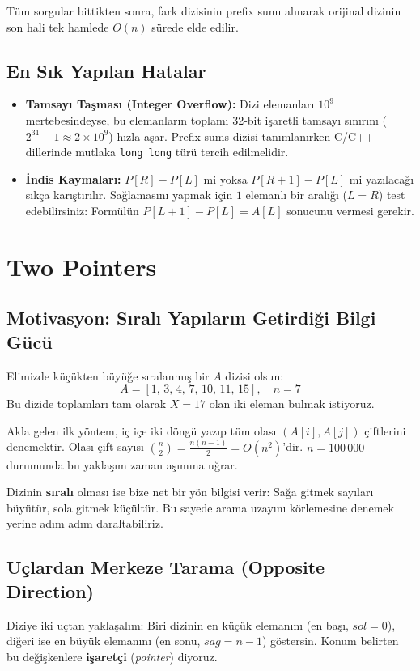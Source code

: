 Tüm sorgular bittikten sonra, fark dizisinin prefix sumı alınarak orijinal dizinin son hali tek hamlede $O(n)$ sürede elde edilir.

\subsection*{En Sık Yapılan Hatalar}
\begin{itemize}
    \item \textbf{Tamsayı Taşması (Integer Overflow):} Dizi elemanları $10^9$ mertebesindeyse, bu elemanların toplamı 32-bit işaretli tamsayı sınırını ($2^{31}-1 \approx 2 \times 10^9$) hızla aşar. Prefix sums dizisi tanımlanırken C/C++ dillerinde mutlaka \texttt{long long} türü tercih edilmelidir.
    \item \textbf{İndis Kaymaları:} $P[R] - P[L]$ mi yoksa $P[R+1] - P[L]$ mi yazılacağı sıkça karıştırılır. Sağlamasını yapmak için $1$ elemanlı bir aralığı ($L = R$) test edebilirsiniz: Formülün $P[L+1] - P[L] = A[L]$ sonucunu vermesi gerekir.
\end{itemize}

\section{Two Pointers}

\subsection{Motivasyon: Sıralı Yapıların Getirdiği Bilgi Gücü}
Elimizde küçükten büyüğe sıralanmış bir $A$ dizisi olsun:
\[
A = [1, \, 3, \, 4, \, 7, \, 10, \, 11, \, 15], \quad n = 7
\]
Bu dizide toplamları tam olarak $X = 17$ olan iki eleman bulmak istiyoruz.

Akla gelen ilk yöntem, iç içe iki döngü yazıp tüm olası $(A[i], A[j])$ çiftlerini denemektir. Olası çift sayısı $\binom{n}{2} = \frac{n(n-1)}{2} = O(n^2)$'dir. $n = 100\,000$ durumunda bu yaklaşım zaman aşımına uğrar.

Dizinin \textbf{sıralı} olması ise bize net bir yön bilgisi verir: Sağa gitmek sayıları büyütür, sola gitmek küçültür. Bu sayede arama uzayını körlemesine denemek yerine adım adım daraltabiliriz.

\subsection{Uçlardan Merkeze Tarama (Opposite Direction)}
Diziye iki uçtan yaklaşalım: Biri dizinin en küçük elemanını (en başı, $sol = 0$), diğeri ise en büyük elemanını (en sonu, $sag = n - 1$) göstersin. Konum belirten bu değişkenlere \textbf{işaretçi} (\emph{pointer}) diyoruz.

